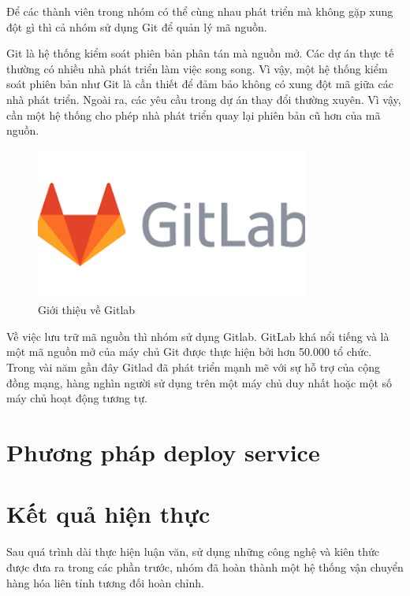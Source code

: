 	Để các thành viên trong nhóm có thể cùng nhau phát triển mà không gặp xung đột gì thì cả nhóm sử dụng Git để quản lý mã nguồn. 
	
	Git là hệ thống kiểm soát phiên bản phân tán mà nguồn mở. Các dự án thực tế thường có nhiều nhà phát triển làm việc song song. Vì vậy, một hệ thống kiểm soát phiên bản như Git là cần thiết để đảm bảo không có xung đột mã giữa các nhà phát triển. Ngoài ra, các yêu cầu trong dự án thay đổi thường xuyên. Vì vậy, cần một hệ thống cho phép nhà phát triển quay lại phiên bản cũ hơn của mã nguồn.
	
	\begin{figure}[!ht]
		\includegraphics[width=0.8\textwidth]{Images/gitlab.png}
		\centering
		\linebreak
		\caption{Giới thiệu về Gitlab}
	\end{figure}
	
	Về việc lưu trữ mã nguồn thì nhóm sử dụng Gitlab. GitLab khá nổi tiếng và là một mã nguồn mở của máy chủ Git được thực hiện bởi hơn 50.000 tổ chức. Trong vài năm gần đây Gitlad đã phát triển mạnh mẽ với sự hỗ trợ của cộng đồng mạng, hàng nghìn người sử dụng trên một máy chủ duy nhất hoặc một số máy chủ hoạt động tương tự.
	

\section{Phương pháp deploy service}



\section{Kết quả hiện thực}

Sau quá trình dài thực hiện luận văn, sử dụng những công nghệ và kiên thức được đưa
ra trong các phần trước, nhóm đã hoàn thành một hệ thống vận chuyển hàng hóa liên tỉnh tương đối hoàn chỉnh.

